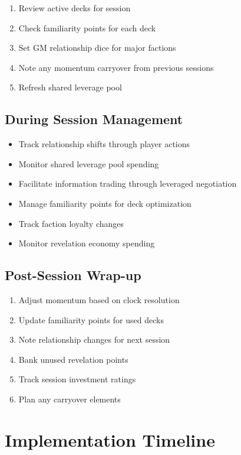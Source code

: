 \begin{enumerate}
\item Review active decks for session
\item Check familiarity points for each deck
\item Set GM relationship dice for major factions
\item Note any momentum carryover from previous sessions
\item Refresh shared leverage pool
\end{enumerate}

\subsection{During Session Management}

\begin{itemize}
\item Track relationship shifts through player actions
\item Monitor shared leverage pool spending
\item Facilitate information trading through leveraged negotiation
\item Manage familiarity points for deck optimization
\item Track faction loyalty changes
\item Monitor revelation economy spending
\end{itemize}

\subsection{Post-Session Wrap-up}

\begin{enumerate}
\item Adjust momentum based on clock resolution
\item Update familiarity points for used decks
\item Note relationship changes for next session
\item Bank unused revelation points
\item Track session investment ratings
\item Plan any carryover elements
\end{enumerate}

\section{Implementation Timeline}

